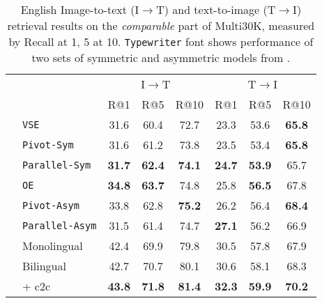 \begin{table*}[t]
\centering
\renewcommand{\arraystretch}{1.3}
\begin{tabular}{llcccccc}
\toprule
& & \multicolumn{3}{c}{I$\rightarrow$T}  & \multicolumn{3}{c}{T$\rightarrow$I}   \\
 						& & R@1 & R@5 & R@10 & R@1 & R@5 & R@10 \\
\cmidrule{3-8}
\parbox[t]{2mm}{} & {\tt VSE}				& 31.6 & 60.4 & 72.7 & 23.3 & 53.6 & \bf{65.8}\\
& {\tt Pivot-Sym}		    & 31.6 & 61.2 & 73.8  & 23.5 & 53.4 & \bf{65.8}\\
& {\tt Parallel-Sym}      & \bf{31.7} & \bf{62.4} & \bf{74.1}  & \bf{24.7} & \bf{53.9} & 65.7 \\
\midrule
\parbox[t]{2mm}{} & {\tt OE}				& \bf{34.8} & \bf{63.7} & 74.8 & 25.8 & \bf{56.5} & 67.8\\
& {\tt Pivot-Asym}    	& 33.8 & 62.8 & \bf{75.2}  & 26.2 & 56.4 & \bf{68.4}\\
& {\tt Parallel-Asym}     & 31.5 & 61.4 & 74.7  & \bf{27.1} & 56.2 & 66.9\\
\midrule
& Monolingual	  			& 42.4 & 69.9 & 79.8 & 30.5 & 57.8 & 67.9  \\
& Bilingual 	  			& 42.7 & 70.7 & 80.1 & 30.6 & 58.1 & 68.3  \\
& + c2c     	  			& \bf{43.8} & \bf{71.8} & \bf{81.4} & \bf{32.3} &  \bf{59.9} & \bf{70.2} \\
\bottomrule
\end{tabular}
\caption{English Image-to-text (I$\rightarrow$T) and text-to-image (T$\rightarrow$I) retrieval results on the \emph{comparable} part of Multi30K, measured by Recall at 1, 5 at 10. {\tt Typewriter} font shows performance of two sets of symmetric and asymmetric models from \citet{gella2017image}.}
\label{tab:bi:bilingualEng}
\end{table*}

